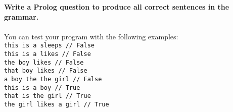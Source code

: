 \documentclass [11pt, a4wide, twoside]{article}
\begin{document}
%
\textbf{Write a Prolog question to produce all correct sentences in the grammar.}\\ \\
%
You can test your program with the following examples: \\
\texttt{this is a sleeps // False} \\
\texttt{this is a likes // False} \\
\texttt{the boy likes // False} \\
\texttt{that boy likes // False} \\
\texttt{a boy the the girl // False} \\
\texttt{this is a boy // True} \\
\texttt{that is the girl // True} \\
\texttt{the girl likes a girl // True}

\newpage
\solution{\fontsize{9pt}{11pt}}
\end{document}
